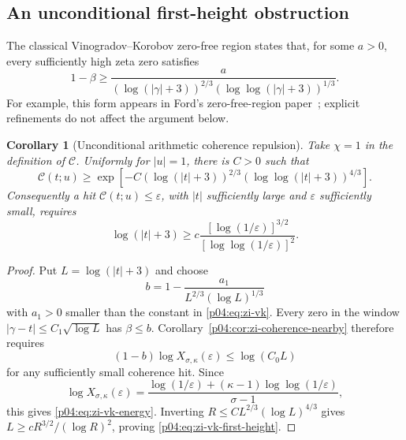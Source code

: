 \documentclass[11pt,letterpaper]{article}
\newtheorem{corollary}[theorem]{Corollary}
\theoremstyle{definition}
\theoremstyle{remark}
\newcommand{\1}{\mathbf 1}
\begin{document}
\subsection{An unconditional first-height obstruction}

The classical Vinogradov--Korobov zero-free region states that,
for some $a>0$, every sufficiently high zeta zero satisfies
\begin{equation}
 1-\beta\ge
 \frac{a}{(\log(|\gamma|+3))^{2/3}
              (\log\log(|\gamma|+3))^{1/3}}.
\label{p04:eq:zi-vk}
\end{equation}
For example, this form appears in Ford's zero-free-region paper~\cite{FordZeroFree};
explicit refinements do not affect the argument below.

\begin{corollary}[Unconditional arithmetic coherence repulsion]
\label{p04:cor:zi-vk-energy}
Take $\chi=1$ in the definition of $\mathcal C$.  Uniformly for
$|u|=1$, there is $C>0$ such that
\begin{equation}
 \mathcal C(t;u)\ge
 \exp\!\left[-C(\log(|t|+3))^{2/3}
                  (\log\log(|t|+3))^{4/3}\right].
\label{p04:eq:zi-vk-energy}
\end{equation}
Consequently a hit $\mathcal C(t;u)\le\varepsilon$, with
$|t|$ sufficiently large and $\varepsilon$ sufficiently small,
requires
\begin{equation}
 \log(|t|+3)\ge
 c\frac{[\log(1/\varepsilon)]^{3/2}}
          {[\log\log(1/\varepsilon)]^2}.
\label{p04:eq:zi-vk-first-height}
\end{equation}
\end{corollary}
\begin{proof}
Put $L=\log(|t|+3)$ and choose
\[
 b=1-\frac{a_1}{L^{2/3}(\log L)^{1/3}}
\]
with $a_1>0$ smaller than the constant in
\eqref{p04:eq:zi-vk}.  Every zero in the window
$|\gamma-t|\le C_1\sqrt{\log L}$ has $\beta\le b$.
Corollary~\ref{p04:cor:zi-coherence-nearby} therefore requires
\[
 (1-b)\log X_{\sigma,\kappa}(\varepsilon)
       \le\log(C_0L)
\]
for any sufficiently small coherence hit.  Since
\[
 \log X_{\sigma,\kappa}(\varepsilon)
 =\frac{\log(1/\varepsilon)
       +(\kappa-1)\log\log(1/\varepsilon)}{\sigma-1},
\]
this gives \eqref{p04:eq:zi-vk-energy}.  Inverting
$R\le C L^{2/3}(\log L)^{4/3}$ gives
$L\ge cR^{3/2}/(\log R)^2$, proving
\eqref{p04:eq:zi-vk-first-height}.
\end{proof}
\end{document}

